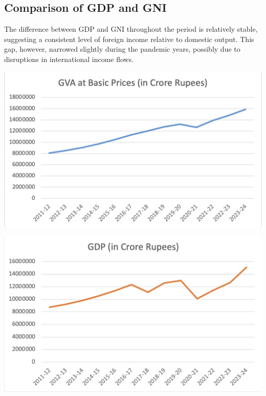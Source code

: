 \documentclass[a4paper,12pt]{extarticle} %
\begin{document}
\subsection{Comparison of GDP and GNI}
The difference between GDP and GNI throughout the period is relatively stable, suggesting a consistent level of foreign income relative to domestic output. This gap, however, narrowed slightly during the pandemic years, possibly due to disruptions in international income flows.

\begin{minipage}{0.45\textwidth}
    \centering
    \includegraphics[width=\textwidth]{Q1/1.png}

\end{minipage}
\hfill
\begin{minipage}{0.45\textwidth}
    \centering
    \includegraphics[width=\textwidth]{Q1/2.png}
 
\end{minipage}

\vspace{10pt} %
\end{document}
